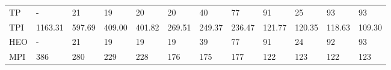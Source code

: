 \begin{table*}
{\begin{tabular}{llllllllllll}
TP       &                - &                21 &                19 &                20 &                20 &                40 &               77 &               91 &               25 &                93 &               93 \\
TPI      &          1163.31 &            597.69 &            409.00 &            401.82 &            269.51 &            249.37 &           236.47 &           121.77 &           120.35 &            118.63 &           109.30 \\
HEO      &                - &                21 &                19 &                19 &                19 &                39 &               77 &               91 &               24 &                92 &               93 \\
MPI      &              386 &               280 &               229 &               228 &               176 &               175 &              177 &              122 &              123 &               122 &              123 \\
\bottomrule
\end{tabular}}
\end{table*}



